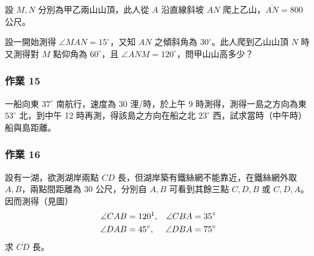 設 $M, N$ 分別為甲乙兩山山頂，此人從 $A$ 沿直線斜坡 $AN$ 爬上乙山，$\overline{AN} = 800$ 公尺。

設一開始測得 $\angle MAN = 15^\circ$，又知 $AN$ 之傾斜角為 $30^\circ$。此人爬到乙山山頂 $N$ 時又測得對 $M$ 點仰角為 $60^\circ$，且 $\angle ANM = 120^\circ$，問甲山山高多少？

\subsubsection*{作業 15}
一船向東 $37^\circ$ 南航行，速度為 30 浬/時，於上午 9 時測得，測得一島之方向為東 $53^\circ$ 北，到中午 12 時再測，得該島之方向在船之北 $23^\circ$ 西，試求當時（中午時）船與島距離。

\label{note:b3s-ch2-p66-homework16-deg}%
\subsubsection*{作業 16}
設有一湖，欲測湖岸兩點 $CD$ 長，但湖岸築有鐵絲網不能靠近，在鐵絲網外取 $A, B$，兩點間距離為 30 公尺，分別自 $A, B$ 可看到其餘三點 $C, D, B$ 或 $C, D, A$。因而測得（見圖）
\begin{align*}
\angle CAB &= 120\footnotemark, & \angle CBA &= 35^\circ \\
\angle DAB &= 45^\circ, & \angle DBA &= 75^\circ
\end{align*}
求 $\overline{CD}$ 長。

